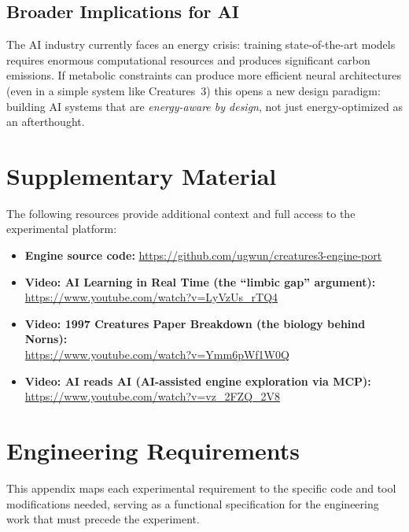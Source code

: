 \documentclass[12pt, a4paper]{article}
\begin{document}
\subsection{Broader Implications for AI}

The AI industry currently faces an energy crisis: training state-of-the-art models requires enormous computational resources and produces significant carbon emissions. If metabolic constraints can produce more efficient neural architectures (even in a simple system like Creatures~3) this opens a new design paradigm: building AI systems that are \emph{energy-aware by design}, not just energy-optimized as an afterthought.

\section*{Supplementary Material}
\label{sec:supplementary}

The following resources provide additional context and full access to the experimental platform:

\begin{itemize}[nosep]
  \item \textbf{Engine source code:} \url{https://github.com/ugwun/creatures3-engine-port}
  \item \textbf{Video: AI Learning in Real Time (the ``limbic gap'' argument):}\\
    \url{https://www.youtube.com/watch?v=LyVzUs_rTQ4}
  \item \textbf{Video: 1997 Creatures Paper Breakdown (the biology behind Norns):}\\
    \url{https://www.youtube.com/watch?v=Ymm6pWf1W0Q}
  \item \textbf{Video: AI reads AI (AI-assisted engine exploration via MCP):}\\
    \url{https://www.youtube.com/watch?v=vz_2FZQ_2V8}
\end{itemize}

\appendix
\section{Engineering Requirements}
\label{app:engineering}

This appendix maps each experimental requirement to the specific code and tool modifications needed, serving as a functional specification for the engineering work that must precede the experiment.
\end{document}
